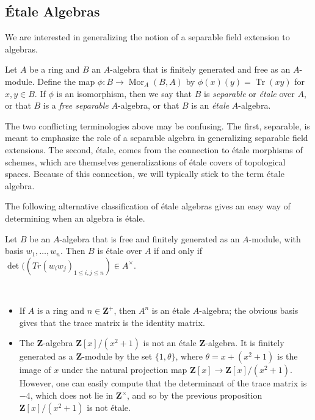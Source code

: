 \documentclass[11pt,openany]{book} %
\newcommand{\Z}{\mathbf{Z}}
\newcommand{\Tr}{\operatorname{Tr}}
\newcommand{\Mor}{\operatorname{Mor}}
\begin{document}

\subsection{\'Etale Algebras}
We are interested in generalizing the notion of a separable field extension to algebras.\\

\begin{definition}
Let $A$ be a ring and $B$ an $A$-algebra that is finitely generated and free as an $A$-module. Define the map $\phi : B \to \Mor_A(B,A)$ by $\phi(x)(y) = \Tr(xy)$ for $x,y \in B$. If $\phi$ is an isomorphism, then we say that $B$ is \emph{separable} or \emph{\'etale} over $A$, or that $B$ is a \emph{free separable} $A$-algebra, or that $B$ is an \emph{\'etale} $A$-algebra.
\end{definition}

\begin{remark}
The two conflicting terminologies above may be confusing. The first, separable, is meant to emphasize the role of a separable algebra in generalizing separable field extensions. The second, \'etale, comes from the connection to \'etale morphisms of schemes, which are themselves generalizations of \'etale covers of topological spaces. Because of this connection, we will typically stick to the term \'etale algebra.
\end{remark}

The following alternative classification of \'etale algebras gives an easy way of determining when an algebra is \'etale.

\begin{proposition}
Let $B$ be an $A$-algebra that is free and finitely generated as an $A$-module, with basis $w_1,\ldots,w_n$. Then $B$ is \'etale over $A$ if and only if $\det ((Tr(w_iw_j)_{1\leq i,j \leq n}) \in A^{\times}$.
\end{proposition}
\medskip

\begin{example}\
\begin{itemize}
	\item If $A$ is a ring and $n \in \Z^+$, then $A^n$ is an \'etale $A$-algebra; the obvious basis gives that the trace matrix is the identity matrix.

 	\item The $\Z$-algebra $\Z[x]/(x^2 + 1)$ is not an \'etale $\Z$-algebra. It is finitely generated as a $\Z$-module by the set $\{1,\theta\}$, where $\theta = x + (x^2+1)$ is the image of $x$ under the natural projection map $\Z[x] \to \Z[x]/(x^2+1)$. However, one can easily compute that the determinant of the trace matrix is $-4$, which does not lie in $\Z^{\times}$, and so by the previous proposition $\Z[x]/(x^2+1)$ is not \'etale.
\end{itemize}
\end{example}
\medskip
\end{document}
